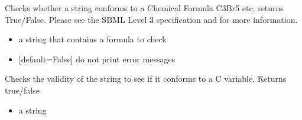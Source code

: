 \documentclass[letterpaper,10pt,english]{sphinxmanual}
\begin{document}
\begin{fulllineitems}
\label{\detokenize{modules_doc:cbmpy.CBCommon.checkChemFormula}}
\pysigstartsignatures
{}
\pysigstopsignatures
\sphinxAtStartPar
Checks whether a string conforms to a Chemical Formula C3Br5 etc, returns True/False. Please see the SBML
Level 3 specification and  for more information.
\begin{itemize}
\item {} 
\sphinxAtStartPar
{} a string that contains a formula to check

\item {} 
\sphinxAtStartPar
{} {[}default=False{]} do not print error messages

\end{itemize}

\end{fulllineitems}


\begin{fulllineitems}
\label{\detokenize{modules_doc:cbmpy.CBCommon.checkId}}
\pysigstartsignatures
{}
\pysigstopsignatures
\sphinxAtStartPar
Checks the validity of the string to see if it conforms to a C variable. Returns true/false
\begin{itemize}
\item {} 
\sphinxAtStartPar
{} a string

\end{itemize}

\end{fulllineitems}

\end{document}
